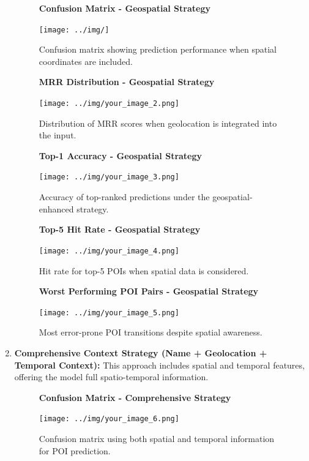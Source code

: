 \documentclass[12pt,a4paper]{article}
\begin{document}
\begin{enumerate}
\begin{figure}[H]
\centering
\textbf{Confusion Matrix - Geospatial Strategy}\par
\vspace{0.5em}
\texttt{[image: ../img/]}
\caption{Confusion matrix showing prediction performance when spatial coordinates are included.}
\label{fig:geospatial_confusion}
\end{figure}

\begin{figure}[H]
\centering
\textbf{MRR Distribution - Geospatial Strategy}\par
\vspace{0.5em}
\texttt{[image: ../img/your\_image\_2.png]}
\caption{Distribution of MRR scores when geolocation is integrated into the input.}
\label{fig:geospatial_mrr}
\end{figure}

\begin{figure}[H]
\centering
\textbf{Top-1 Accuracy - Geospatial Strategy}\par
\vspace{0.5em}
\texttt{[image: ../img/your\_image\_3.png]}
\caption{Accuracy of top-ranked predictions under the geospatial-enhanced strategy.}
\label{fig:geospatial_top1}
\end{figure}

\begin{figure}[H]
\centering
\textbf{Top-5 Hit Rate - Geospatial Strategy}\par
\vspace{0.5em}
\texttt{[image: ../img/your\_image\_4.png]}
\caption{Hit rate for top-5 POIs when spatial data is considered.}
\label{fig:geospatial_top5}
\end{figure}

\begin{figure}[H]
\centering
\textbf{Worst Performing POI Pairs - Geospatial Strategy}\par
\vspace{0.5em}
\texttt{[image: ../img/your\_image\_5.png]}
\caption{Most error-prone POI transitions despite spatial awareness.}
\label{fig:geospatial_worst_pairs}
\end{figure}

\item \textbf{Comprehensive Context Strategy (Name + Geolocation + Temporal Context):} This approach includes spatial and temporal features, offering the model full spatio-temporal information.

\begin{figure}[H]
\centering
\textbf{Confusion Matrix - Comprehensive Strategy}\par
\vspace{0.5em}
\texttt{[image: ../img/your\_image\_6.png]}
\caption{Confusion matrix using both spatial and temporal information for POI prediction.}
\label{fig:comprehensive_confusion}
\end{figure}


\end{enumerate}
\end{document}
